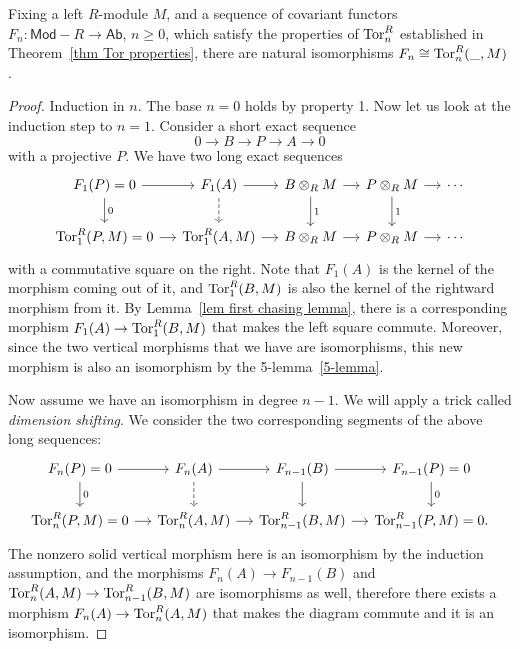 \begin{thm}
    Fixing a left $R$-module $M$, and a sequence of covariant functors $F_n:\mathsf{Mod-}R\to \mathsf{Ab}$, $n\geq 0$, which satisfy the properties of $\operatorname{Tor}_n^R$ established in Theorem~\ref{thm Tor properties}, there are natural isomorphisms $F_n\cong \operatorname{Tor}_n^R(\_,M)$.
\end{thm}
\begin{proof}
    Induction in $n$. The base $n=0$ holds by property 1. Now let us look at the induction step to $n=1$. Consider a short exact sequence 
    \[0\to B\to P\to A\to 0\]
    with a projective $P$. We have two long exact sequences
    \[\begin{tikzcd}[column sep=small]
        F_1(P)=0\arrow[r]\arrow[d,"0"] & F_1(A)\arrow[r]\arrow[d,dashed] & B\otimes_R M \arrow[r]\arrow[d,"1"] & P\otimes_R M\arrow[d,"1"]\arrow[r] & \cdots \\
        \Tor_1^R(P,M)=0\arrow[r] & \Tor_1^R(A,M)\arrow[r] & B\otimes_R M \arrow[r] & P\otimes_R M \arrow[r] &\cdots 
    \end{tikzcd}\]
    with a commutative square on the right. Note that $F_1(A)$ is the kernel of the morphism coming out of it, and $\operatorname{Tor}_1^R(B,M)$ is also the kernel of the rightward morphism from it. By Lemma~\ref{lem first chasing lemma}, there is a corresponding morphism $F_1(A)\to \operatorname{Tor}_1^R(B,M)$ that makes the left square commute. Moreover, since the two vertical morphisms that we have are isomorphisms, this new morphism is also an isomorphism by the 5-lemma~\ref{5-lemma}.

    Now assume we have an isomorphism in degree $n-1$. We will apply a trick called \emph{dimension shifting}. We consider the two corresponding segments of the above long sequences:
    \[\begin{tikzcd}[column sep=small]
        F_n(P)=0\arrow[r]\arrow[d,"0"] & F_n(A)\arrow[r]\arrow[d,dashed] & F_{n-1}(B) \arrow[r]\arrow[d] & F_{n-1}(P)\arrow[d,"0"]=0 \\
        \Tor_n^R(P,M)=0\arrow[r] & \Tor_n^R(A,M)\arrow[r] & \Tor_{n-1}^R(B,M) \arrow[r] & \Tor_{n-1}^R(P,M)=0.
    \end{tikzcd}\]
    The nonzero solid vertical morphism here is an isomorphism by the induction assumption, and the morphisms $F_n(A)\to F_{n-1}(B)$ and $\operatorname{Tor}^R_n(A,M)\to \operatorname{Tor}_{n-1}^R(B,M)$ are isomorphisms as well, therefore there exists a morphism $F_n(A)\to \operatorname{Tor}_n^R(A,M)$ that makes the diagram commute and it is an isomorphism.
\end{proof}



